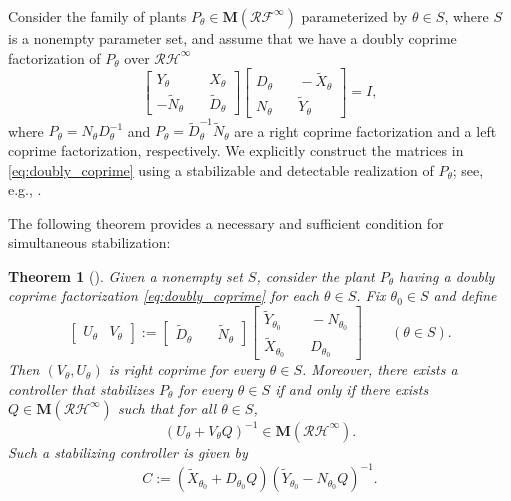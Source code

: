 \documentclass[letterpaper, 12pt, draftcls, onecolumn]{ieeeconf}
\newtheorem{theorem}{Theorem}[section]
\begin{document}
Consider the family of plants $P_\theta 
\in \mathbf{M}(\mathcal{RF}^{\infty})$ 
parameterized by $\theta\in S$, 
where $S$ is a nonempty parameter set,
and assume that we have a doubly coprime factorization of 
$P_{\theta}$ over $\mathcal{RH}^{\infty}$ 
\begin{equation}
\label{eq:doubly_coprime}
\begin{bmatrix}
Y_{\theta}  &\quad  X_{\theta} \\
-\tilde N_{\theta} &\quad  \tilde D_{\theta}
\end{bmatrix}
\begin{bmatrix}
D_{\theta}  &\quad  -\tilde X_{\theta} \\
N_{\theta} &\quad  \tilde Y_{\theta}
\end{bmatrix} = I,
\end{equation}
where $P_{\theta}=N_{\theta}D_{\theta}^{-1}$ and 
$P_{\theta}=\tilde D_{\theta}^{-1}\tilde N_{\theta}$ are
a right coprime factorization and a left coprime factorization,
respectively.
We explicitly construct the matrices in \eqref{eq:doubly_coprime} using
a stabilizable and detectable realization of $P_{\theta}$;
see, e.g.,
\cite[Theorem 4.2.1]{vidyasagar1985}.

The following theorem provides a necessary and sufficient condition 
for simultaneous stabilization:
\begin{theorem}[\hspace{-0.001pt}\cite{Vidyasagar1982, vidyasagar1985}]
	\label{thm:SS_CM}
	{\it
Given a nonempty set $S$, consider the plant $P_{\theta}$ 
		having a doubly coprime factorization \eqref{eq:doubly_coprime} 
		for each $\theta \in S$.
		Fix $\theta_0 \in S$ and define
		\begin{equation}
		\label{eq:UVdef}
		\begin{bmatrix}
		U_{\theta} &
		V_{\theta}
		\end{bmatrix}
		:=
		\begin{bmatrix}
		\tilde D_{\theta} &\quad
		\tilde N_{\theta}
		\end{bmatrix}
		\begin{bmatrix}
		\tilde Y_{\theta_0} & \quad -N_{\theta_0}\\
		\tilde X_{\theta_0} & \quad D_{\theta_0}
		\end{bmatrix}
		\qquad
		(\theta \in S).
		\end{equation}
		Then $(V_{\theta}, U_{\theta})$ is right coprime for every
		$\theta \in S$. Moreover, 
		there exists a controller that stabilizes 
		$P_{\theta}$ for every $\theta \in S$ if and only if
		there exists $Q \in \mathbf{M}(\mathcal{RH}^{\infty})$ such that
		for all $\theta \in S$,
		\begin{equation}
		\label{eq:SS_Unimodular}
		(U_{\theta} + V_{\theta}Q)^{-1} \in \mathbf{M}(\mathcal{RH}^{\infty}).
		\end{equation}
		Such a stabilizing controller is given by
		\begin{equation}
		\label{eq:SScontroller}
		C :=  (\tilde X_{\theta_0} + 
		D_{\theta_0} Q)
		(\tilde Y_{\theta_0} - N_{\theta_0}Q )^{-1}.
		\end{equation}
	}
\end{theorem}
\end{document}
